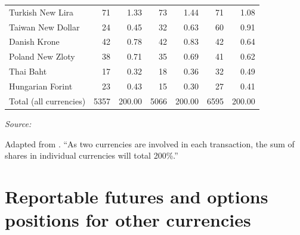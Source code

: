 \documentclass[a4paper, twoside]{templates/ociamthesis}
\begin{document}
\begin{table}[H]
\begin{threeparttable}
\begin{tabular}[t]{lrrrrrr}
Turkish New Lira & 71 & 1.33 & 73 & 1.44 & 71 & 1.08\\
Taiwan New Dollar & 24 & 0.45 & 32 & 0.63 & 60 & 0.91\\
Danish Krone & 42 & 0.78 & 42 & 0.83 & 42 & 0.64\\
Poland New Zloty & 38 & 0.71 & 35 & 0.69 & 41 & 0.62\\
Thai Baht & 17 & 0.32 & 18 & 0.36 & 32 & 0.49\\
Hungarian Forint & 23 & 0.43 & 15 & 0.30 & 27 & 0.41\\
\midrule
Total (all currencies) & 5357 & 200.00 & 5066 & 200.00 & 6595 & 200.00\\
\bottomrule
\end{tabular}
\begin{tablenotes}[para]
\item \textit{\footnotesize{Source:}} 
\item \footnotesize{Adapted from \textcite{bankforinternationalsettlements2021b}. ``As two currencies are involved in each transaction, the sum of shares in individual currencies will total 200\%.'' \autocite[ 5]{bankforinternationalsettlements2019}}
\end{tablenotes}
\end{threeparttable}
\end{table}

\clearpage

\hypertarget{appendixa3}{%
\section{Reportable futures and options positions for other currencies}\label{appendixa3}}
\end{document}
